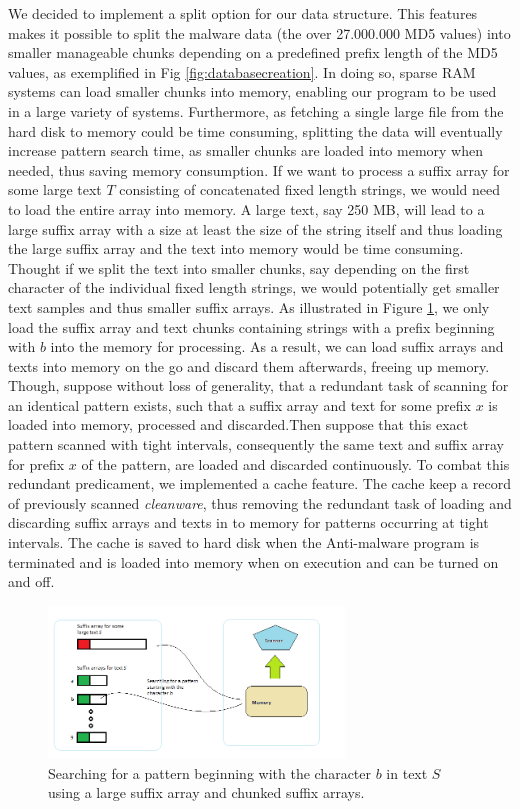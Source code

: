 \documentclass[12pt]{article} %
\begin{document}
We decided to implement a split option for our data structure. This features makes it possible to split the malware data (the over 27.000.000 MD5 values) into smaller manageable chunks depending on a predefined  prefix length of the MD5 values, as exemplified in Fig \ref{fig:databasecreation}. In doing so, sparse RAM systems can load smaller chunks into memory, enabling our program to be used in a large variety of systems. Furthermore, as fetching a single large file from the hard disk to memory could be time consuming, splitting the data will eventually increase pattern search time, as smaller chunks are loaded into memory when needed, thus saving memory consumption. If we want to process a suffix array for some large text $T$ consisting of concatenated fixed length strings, we would need to load the entire array into memory. A large text, say 250 MB, will lead to a large suffix array with a size at least the size of the string itself and thus loading the large suffix array and the text into memory would be time consuming. Thought if we split the text into smaller chunks, say depending on the first character of the individual fixed length strings, we would potentially get smaller text samples and thus smaller suffix arrays. As illustrated in Figure \ref{fig:chunks}, we only load the suffix array and text chunks containing strings with a prefix beginning with $b$ into the memory for processing. As a result, we can load suffix arrays and texts  into memory on the go and discard them afterwards, freeing up memory. Though, suppose without loss of generality, that a redundant task of scanning for an identical pattern exists, such that a suffix array and text for some prefix $x$ is loaded into memory, processed and discarded.Then suppose that this exact pattern scanned with tight intervals, consequently the same text and suffix array for prefix $x$ of the pattern, are loaded and discarded continuously. To combat this redundant predicament, we implemented a cache feature. The cache keep a record of previously scanned \emph{cleanware}, thus removing the redundant task of loading and discarding suffix arrays and texts in to memory for patterns occurring at tight intervals. The cache is saved to hard disk when the Anti-malware program  is terminated and is loaded into memory when on execution and can be turned on and off. 
\begin{figure}[H]
    \centering
    \includegraphics[width=0.7\textwidth]{chunks}
    \captionsetup{width=0.8\textwidth}
    \caption{Searching for a pattern beginning with the character $b$ in text $S$ using a large suffix array and chunked suffix arrays.}
    \label{fig:chunks}
\end{figure}
\end{document}
